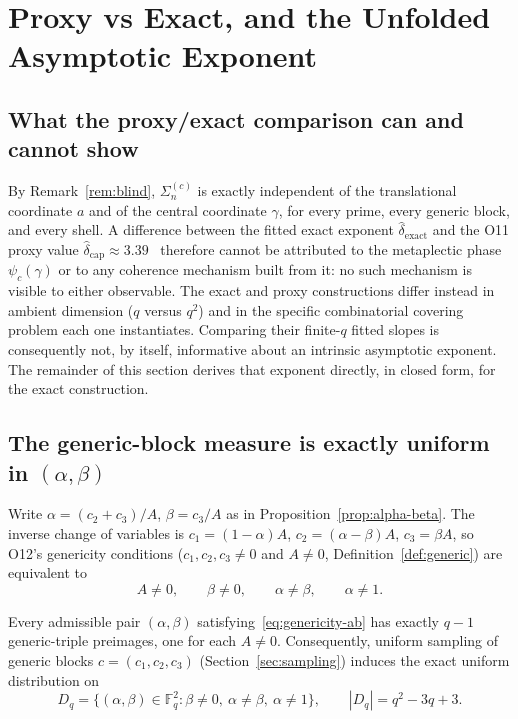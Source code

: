 \section{Proxy vs Exact, and the Unfolded Asymptotic Exponent}
  \label{sec:comparison}

  \subsection{What the proxy/exact comparison can and cannot show}

    By Remark~\ref{rem:blind}, $\Sigma_n^{(c)}$ is exactly independent of the translational
    coordinate $a$ and of the central coordinate $\gamma$, for every prime, every generic
    block, and every shell.
    A difference between the fitted exact exponent $\hat{\delta}_{\mathrm{exact}}$ and the
    O11 proxy value $\hat{\delta}_{\mathrm{cap}}\approx 3.39$~\cite{Beau2026a15} therefore
    cannot be attributed to the metaplectic phase $\psi_c(\gamma)$ or to any coherence
    mechanism built from it: no such mechanism is visible to either observable.
    The exact and proxy constructions differ instead in ambient dimension ($q$ versus $q^2$)
    and in the specific combinatorial covering problem each one instantiates.
    Comparing their finite-$q$ fitted slopes is consequently not, by itself, informative
    about an intrinsic asymptotic exponent.
    The remainder of this section derives that exponent directly, in closed form, for the
    exact construction.

  \subsection{The generic-block measure is exactly uniform in $(\alpha,\beta)$}

    Write $\alpha=(c_2+c_3)/A$, $\beta=c_3/A$ as in Proposition~\ref{prop:alpha-beta}.
    The inverse change of variables is $c_1=(1-\alpha)A$, $c_2=(\alpha-\beta)A$, $c_3=\beta A$,
    so O12's genericity conditions ($c_1,c_2,c_3\neq 0$ and $A\neq 0$, Definition~\ref{def:generic})
    are equivalent to
    \begin{equation}
      A\neq 0, \qquad \beta\neq 0, \qquad \alpha\neq\beta, \qquad \alpha\neq 1.
      \label{eq:genericity-ab}
    \end{equation}

    \begin{proposition}
      \label{prop:uniform-ab}
      Every admissible pair $(\alpha,\beta)$ satisfying~\eqref{eq:genericity-ab} has exactly
      $q-1$ generic-triple preimages, one for each $A\neq 0$.
      Consequently, uniform sampling of generic blocks $c=(c_1,c_2,c_3)$
      (Section~\ref{sec:sampling}) induces the exact uniform distribution on
      \begin{equation}
        D_q = \{(\alpha,\beta)\in\mathbb{F}_q^2 : \beta\neq 0,\ \alpha\neq\beta,\ \alpha\neq 1\},
        \qquad |D_q|=q^2-3q+3.
        \label{eq:Dq}
      \end{equation}
    \end{proposition}

